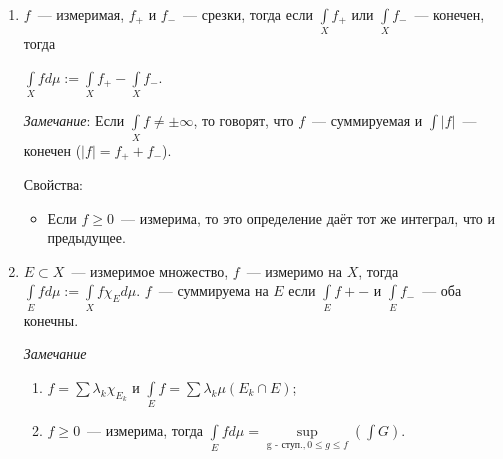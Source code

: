 \documentclass{article}
\begin{document}
\begin{enumerate}
\begin{itemize}
                \end{itemize}
                
            \item $f$~--- измеримая, $f_+$ и $f_-$~--- срезки, тогда если $\int\limits_{X} f_+$ или $\int\limits_{X} f_-$~--- конечен, тогда 
            
                $\int\limits_{X} f d \mu := \int\limits_{X} f_+ - \int\limits_{X} f_-$. 
                
                \textit{Замечание}: Если $\int\limits_{X} f \neq \pm \infty$, то говорят, что $f$~--- суммируемая и $\int |f|$~--- конечен ($|f| = f_+ + f_-$).
                
                Свойства:
                
                \begin{itemize}
                
                    \item Если $f \geqslant 0$~--- измерима, то это определение даёт тот же интеграл, что и предыдущее.
                
                \end{itemize}
            
            \item $E \subset X$~--- измеримое множество, $f$~--- измеримо на $X$, тогда $\int\limits_{E} f d \mu := \int\limits_{X} f \chi_E d \mu$. $f$~--- суммируема на $E$ если $\int\limits_{E} f+-$ и $\int\limits_{E} f_-$~--- оба конечны.
            
                \textit{Замечание} 
                
                    \begin{enumerate}
                    
                        \item $f = \sum \lambda_k \chi_{E_k}$ и $\int\limits_{E} f = \sum \lambda_k \mu \left( E_k \cap E \right)$;
                
                        \item $f \geqslant 0$~--- измерима, тогда $\int\limits_{E} f d \mu = \sup\limits_{\text{g - ступ.}, 0 \leqslant g \leqslant f} \left( \int G \right)$.
                        
                    \end{enumerate}
                    
        \end{enumerate}
        
\end{document}
